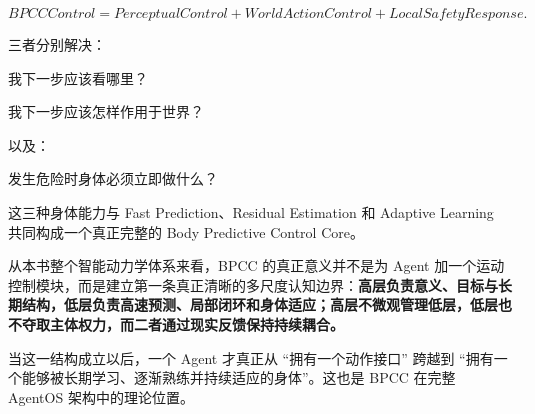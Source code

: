 \[
\boxed{
BPCCControl
=
PerceptualControl
+
WorldActionControl
+
LocalSafetyResponse.
}
\]

三者分别解决：

\begin{statementbox}
我下一步应该看哪里？
\end{statementbox}

\begin{statementbox}
我下一步应该怎样作用于世界？
\end{statementbox}

以及：

\begin{statementbox}
发生危险时身体必须立即做什么？
\end{statementbox}

这三种身体能力与 Fast Prediction、Residual Estimation 和 Adaptive Learning 共同构成一个真正完整的 Body Predictive Control Core。


从本书整个智能动力学体系来看，BPCC 的真正意义并不是为 Agent 加一个运动控制模块，而是建立第一条真正清晰的多尺度认知边界：\textbf{高层负责意义、目标与长期结构，低层负责高速预测、局部闭环和身体适应；高层不微观管理低层，低层也不夺取主体权力，而二者通过现实反馈保持持续耦合。}

当这一结构成立以后，一个 Agent 才真正从 ``拥有一个动作接口'' 跨越到 ``拥有一个能够被长期学习、逐渐熟练并持续适应的身体''。这也是 BPCC 在完整 AgentOS 架构中的理论位置。
